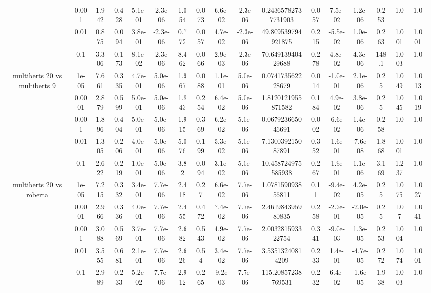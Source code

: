 \begin{tabular}{|c|c|c|c|c|c|c|c|c|c|c|c|c|c|c|c|c|}
 & 0.001 & 1.942 & 0.428 & 5.1e-01 & -2.3e-06 & 1.054 & 0.073 & 6.6e-02 & -2.3e-06 & 0.24365782737731903 & 0.057 & 7.5e-02 & 1.2e-06 & 0.253 & 1.0 & 1.0 \\
 & 0.01 & 0.875 & 0.094 & 3.8e-01 & -2.3e-06 & 0.772 & 0.057 & 4.7e-02 & -2.3e-06 & 49.809539794921875 & 0.215 & -5.5e-02 & 1.0e-06 & 0.263 & 1.001 & 1.001 \\
 & 0.1 & 3.306 & 0.173 & 8.1e-02 & -2.3e-06 & 8.462 & 0.066 & 2.9e-03 & -2.3e-06 & 70.64913940429688 & 0.278 & 4.8e-02 & 4.3e-06 & 148.1 & 1.003 & 1.0 \\
\hline
\multirow{5}{*}{multiberts 20 vs multiberts 9} & 1e-05 & 7.661 & 0.335 & 4.7e-01 & 5.0e-06 & 1.967 & 0.088 & 1.1e-01 & 5.0e-06 & 0.074173562228679 & 0.014 & -1.0e-01 & 2.1e-06 & 0.25 & 1.049 & 1.013 \\
 & 0.0001 & 2.879 & 0.599 & 5.0e-01 & 5.0e-06 & 1.843 & 0.254 & 6.4e-02 & 5.0e-06 & 1.8120121955871582 & 0.184 & 4.9e-02 & 3.8e-06 & 0.25 & 1.045 & 1.019 \\
 & 0.001 & 1.896 & 0.404 & 5.0e-01 & 5.0e-06 & 1.915 & 0.369 & 6.2e-02 & 5.0e-06 & 0.067923665046691 & 0.002 & -6.6e-02 & 1.4e-06 & 0.258 & 1.0 & 1.0 \\
 & 0.01 & 1.305 & 0.206 & 4.0e-01 & 5.0e-06 & 5.076 & 0.199 & 5.3e-02 & 5.0e-06 & 7.130039215087891 & 0.352 & -1.6e-01 & -7.6e-08 & 1.868 & 1.001 & 1.0 \\
 & 0.1 & 2.622 & 0.219 & 1.0e-01 & 5.0e-06 & 3.82 & 0.094 & 3.1e-02 & 5.0e-06 & 10.458724975585938 & 0.267 & -1.9e-01 & 1.1e-06 & 3.169 & 1.237 & 1.0 \\
\hline
\multirow{5}{*}{multiberts 20 vs roberta } & 1e-05 & 7.215 & 0.332 & 3.4e-01 & 7.7e-06 & 2.418 & 0.27 & 6.6e-02 & 7.7e-06 & 1.078159093856811 & 0.11 & -9.4e-02 & 4.2e-05 & 0.25 & 1.075 & 1.027 \\
 & 0.0001 & 2.966 & 0.336 & 4.0e-01 & 7.7e-06 & 2.455 & 0.472 & 7.4e-02 & 7.7e-06 & 2.461984395980835 & 0.258 & -2.2e-01 & -2.0e-05 & 0.25 & 1.07 & 1.041 \\
 & 0.001 & 3.088 & 0.569 & 3.7e-01 & 7.7e-06 & 2.682 & 0.543 & 4.9e-02 & 7.7e-06 & 2.003281593322754 & 0.341 & -9.0e-03 & 1.3e-05 & 0.253 & 1.004 & 1.0 \\
 & 0.01 & 3.555 & 0.681 & 2.1e-01 & 7.7e-06 & 2.626 & 0.54 & 3.4e-02 & 7.7e-06 & 3.53513240814209 & 0.233 & 1.4e-01 & -4.7e-05 & 0.272 & 1.074 & 1.001 \\
 & 0.1 & 2.989 & 0.233 & 5.2e-02 & 7.7e-06 & 2.912 & 0.265 & -9.2e-03 & 7.7e-06 & 115.20857238769531 & 0.232 & 6.4e-02 & -1.6e-05 & 1.938 & 1.003 & 1.0 \\

\end{tabular}
